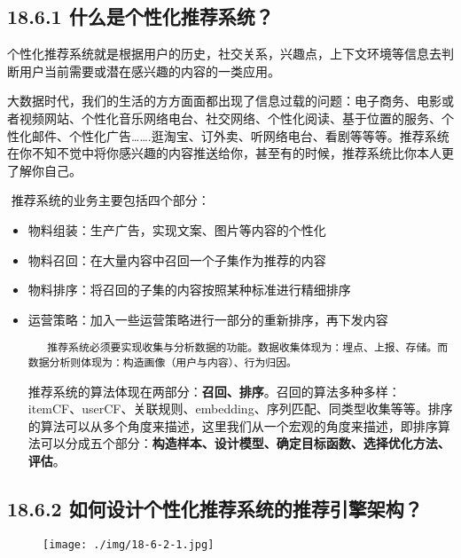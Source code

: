 \subsection{18.6.1
什么是个性化推荐系统？}\label{ux4ec0ux4e48ux662fux4e2aux6027ux5316ux63a8ux8350ux7cfbux7edf}

​
个性化推荐系统就是根据用户的历史，社交关系，兴趣点，上下文环境等信息去判断用户当前需要或潜在感兴趣的内容的一类应用。

​
大数据时代，我们的生活的方方面面都出现了信息过载的问题：电子商务、电影或者视频网站、个性化音乐网络电台、社交网络、个性化阅读、基于位置的服务、个性化邮件、个性化广告\ldots{}\ldots{}.逛淘宝、订外卖、听网络电台、看剧等等等。推荐系统在你不知不觉中将你感兴趣的内容推送给你，甚至有的时候，推荐系统比你本人更了解你自己。

​ 推荐系统的业务主要包括四个部分：

\begin{itemize}
\item
  物料组装：生产广告，实现文案、图片等内容的个性化
\item
  物料召回：在大量内容中召回一个子集作为推荐的内容
\item
  物料排序：将召回的子集的内容按照某种标准进行精细排序
\item
  运营策略：加入一些运营策略进行一部分的重新排序，再下发内容

\begin{verbatim}
​   推荐系统必须要实现收集与分析数据的功能。数据收集体现为：埋点、上报、存储。而数据分析则体现为：构造画像（用户与内容）、行为归因。 
\end{verbatim}

  ​
  推荐系统的算法体现在两部分：\textbf{召回、排序}。召回的算法多种多样：itemCF、userCF、关联规则、embedding、序列匹配、同类型收集等等。排序的算法可以从多个角度来描述，这里我们从一个宏观的角度来描述，即排序算法可以分成五个部分：\textbf{构造样本、设计模型、确定目标函数、选择优化方法、评估}。
\end{itemize}

\subsection{18.6.2
如何设计个性化推荐系统的推荐引擎架构？}\label{ux5982ux4f55ux8bbeux8ba1ux4e2aux6027ux5316ux63a8ux8350ux7cfbux7edfux7684ux63a8ux8350ux5f15ux64ceux67b6ux6784}

\begin{figure}
\centering
\texttt{[image: ./img/18-6-2-1.jpg]}
\caption{}
\end{figure}


